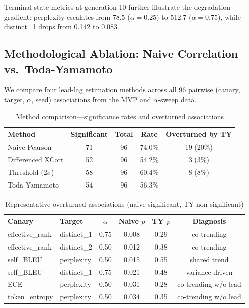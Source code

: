 \documentclass[letterpaper]{article}
\begin{document}
Terminal-state metrics at generation 10 further illustrate the degradation gradient: perplexity escalates from 78.5 ($\alpha=0.25$) to 512.7 ($\alpha=0.75$), while distinct\_1 drops from 0.142 to 0.083.

\subsection{Methodological Ablation: Naive Correlation vs.\ Toda-Yamamoto}

We compare four lead-lag estimation methods across all 96 pairwise (canary, target, $\alpha$, seed) associations from the MVP and $\alpha$-sweep data.

\begin{table}[h]
\centering
\caption{Method comparison---significance rates and overturned associations}
\label{tab:method}
\begin{tabular}{lcccc}
\toprule
Method & Significant & Total & Rate & Overturned by TY \\
\midrule
Naive Pearson & 71 & 96 & 74.0\% & 19 (20\%) \\
Differenced XCorr & 52 & 96 & 54.2\% & 3 (3\%) \\
Threshold (2$\sigma$) & 58 & 96 & 60.4\% & 8 (8\%) \\
Toda-Yamamoto & 54 & 96 & 56.3\% & --- \\
\bottomrule
\end{tabular}
\end{table}

\begin{table}[h]
\centering
\caption{Representative overturned associations (naive significant, TY non-significant)}
\label{tab:overturned}
\begin{tabular}{llcccc}
\toprule
Canary & Target & $\alpha$ & Naive $p$ & TY $p$ & Diagnosis \\
\midrule
effective\_rank & distinct\_1 & 0.75 & 0.008 & 0.29 & co-trending \\
effective\_rank & distinct\_2 & 0.50 & 0.012 & 0.38 & co-trending \\
self\_BLEU & perplexity & 0.50 & 0.015 & 0.55 & shared trend \\
self\_BLEU & distinct\_1 & 0.75 & 0.021 & 0.48 & variance-driven \\
ECE & perplexity & 0.50 & 0.031 & 0.28 & co-trending w/o lead \\
token\_entropy & perplexity & 0.50 & 0.034 & 0.35 & co-trending w/o lead \\
\bottomrule
\end{tabular}
\end{table}
\end{document}
